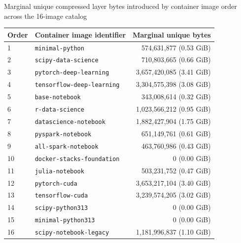 \begin{table}[ht]{Marginal unique compressed layer bytes introduced by container image order across the 16-image catalog}
\label{tab:e5-marginal}
\centering
\small
\begin{tabular}{llr}
\toprule
Order & Container image identifier & Marginal unique bytes \\
\midrule
1 & \texttt{minimal-python} & 574,631,877 (0.53 GiB) \\
2 & \texttt{scipy-data-science} & 710,803,665 (0.66 GiB) \\
3 & \texttt{pytorch-deep-learning} & 3,657,420,085 (3.41 GiB) \\
4 & \texttt{tensorflow-deep-learning} & 3,304,575,398 (3.08 GiB) \\
5 & \texttt{base-notebook} & 343,008,614 (0.32 GiB) \\
6 & \texttt{r-data-science} & 1,023,566,212 (0.95 GiB) \\
7 & \texttt{datascience-notebook} & 1,882,427,904 (1.75 GiB) \\
8 & \texttt{pyspark-notebook} & 651,149,761 (0.61 GiB) \\
9 & \texttt{all-spark-notebook} & 463,760,986 (0.43 GiB) \\
10 & \texttt{docker-stacks-foundation} & 0 (0.00 GiB) \\
11 & \texttt{julia-notebook} & 503,231,752 (0.47 GiB) \\
12 & \texttt{pytorch-cuda} & 3,653,217,104 (3.40 GiB) \\
13 & \texttt{tensorflow-cuda} & 3,239,574,205 (3.02 GiB) \\
14 & \texttt{scipy-python313} & 0 (0.00 GiB) \\
15 & \texttt{minimal-python313} & 0 (0.00 GiB) \\
16 & \texttt{scipy-notebook-legacy} & 1,181,996,837 (1.10 GiB) \\
\bottomrule
\end{tabular}
\end{table}
